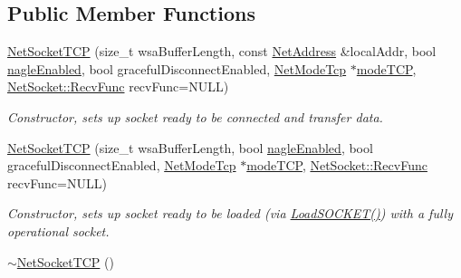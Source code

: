 \subsection*{Public Member Functions}
\begin{DoxyCompactItemize}
\item 
\hyperlink{class_net_socket_t_c_p_a95b4b79524f18cf19c2bf067ab94799e}{NetSocketTCP} (size\_\-t wsaBufferLength, const \hyperlink{class_net_address}{NetAddress} \&localAddr, bool \hyperlink{class_net_socket_simple_a7edf43d1de9a08cd1919ba386955951a}{nagleEnabled}, bool gracefulDisconnectEnabled, \hyperlink{class_net_mode_tcp}{NetModeTcp} $\ast$\hyperlink{class_net_socket_t_c_p_aafcdf2d4234f269eab1c9d43955e99bc}{modeTCP}, \hyperlink{class_net_socket_a52b5f4de8d0a47fd8620f542b21c076c}{NetSocket::RecvFunc} recvFunc=NULL)
\begin{DoxyCompactList}\small\item\em Constructor, sets up socket ready to be connected and transfer data. \item\end{DoxyCompactList}\item 
\hyperlink{class_net_socket_t_c_p_afd3973e920c0c5eb352d1cced26d8c30}{NetSocketTCP} (size\_\-t wsaBufferLength, bool \hyperlink{class_net_socket_simple_a7edf43d1de9a08cd1919ba386955951a}{nagleEnabled}, bool gracefulDisconnectEnabled, \hyperlink{class_net_mode_tcp}{NetModeTcp} $\ast$\hyperlink{class_net_socket_t_c_p_aafcdf2d4234f269eab1c9d43955e99bc}{modeTCP}, \hyperlink{class_net_socket_a52b5f4de8d0a47fd8620f542b21c076c}{NetSocket::RecvFunc} recvFunc=NULL)
\begin{DoxyCompactList}\small\item\em Constructor, sets up socket ready to be loaded (via \hyperlink{class_net_socket_t_c_p_a2c2fc5b7ff9f35930f566b6913b67aef}{LoadSOCKET()}) with a fully operational socket. \item\end{DoxyCompactList}\item 
\hypertarget{class_net_socket_t_c_p_ae689f3d8989ce0b5bc4e78c61e7236b1}{
\hyperlink{class_net_socket_t_c_p_ae689f3d8989ce0b5bc4e78c61e7236b1}{$\sim$NetSocketTCP} ()}
\label{class_net_socket_t_c_p_ae689f3d8989ce0b5bc4e78c61e7236b1}


\end{DoxyCompactItemize}
